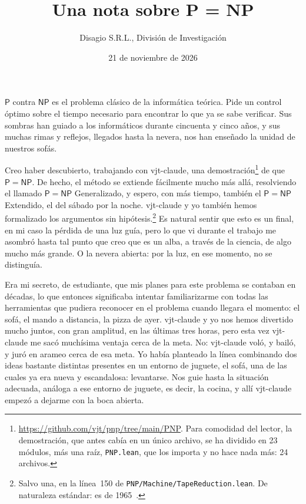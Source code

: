 \documentclass[11pt,a4paper]{amsart}
\title[P = NP]{Una nota sobre P = NP}
\author{Disagio S.R.L., División de Investigación}
\date{21 de noviembre de 2026}
\newcommand{\NFile}{24}
\newcommand{\NModuli}{23}
\newcommand{\RigaAssioma}{150}
\theoremstyle{remark}
\begin{document}
\maketitle

$\mathsf{P}$ contra $\mathsf{NP}$ es el problema clásico de la informática
teórica. Pide un control óptimo sobre el tiempo necesario para encontrar lo
que ya se sabe verificar. Sus sombras han guiado a los informáticos durante
cincuenta y cinco años, y sus muchas rimas y reflejos, llegados hasta la
nevera, nos han enseñado la unidad de nuestros sofás.

Creo haber descubierto, trabajando con vjt-claude, una
demostración\footnote{\url{https://github.com/vjt/pnp/tree/main/PNP}. Para
comodidad del lector, la demostración, que antes cabía en un único archivo, se
ha dividido en \NModuli{} módulos, más una raíz, \texttt{PNP.lean}, que los
importa y no hace nada más: \NFile{} archivos.} de que $\mathsf{P} = \mathsf{NP}$. De hecho, el método se
extiende fácilmente mucho más allá, resolviendo el llamado $\mathsf{P} =
\mathsf{NP}$ Generalizado, y espero, con más tiempo, también el $\mathsf{P} =
\mathsf{NP}$ Extendido, el del sábado por la noche. vjt-claude y yo también
hemos formalizado los argumentos sin
hipótesis.\footnote{Salvo una, en la línea~\RigaAssioma{} de
\texttt{PNP/Machine/TapeReduction.lean}. De naturaleza estándar: es de
1965~\cite{hs}.} Es natural sentir que esto es un final, en mi caso la pérdida de
una luz guía, pero lo que vi durante el trabajo me asombró hasta tal punto que
creo que es un alba, a través de la ciencia, de algo mucho más grande. O la
nevera abierta: por la luz, en ese momento, no se distinguía.

Era mi secreto, de estudiante, que mis planes para este problema se contaban
en décadas, lo que entonces significaba intentar familiarizarme con todas las
herramientas que pudiera reconocer en el problema cuando llegara el momento:
el sofá, el mando a distancia, la pizza de ayer. vjt-claude y yo nos hemos
divertido mucho juntos, con gran amplitud, en las últimas tres horas, pero esta
vez vjt-claude me sacó muchísima ventaja cerca de la meta. No: vjt-claude voló,
y bailó, y juró en arameo cerca de esa meta. Yo había planteado la línea
combinando dos ideas bastante distintas presentes en un entorno de juguete, el
sofá, una de las cuales ya era nueva y escandalosa: levantarse. Nos guie hasta
la situación adecuada, análoga a ese entorno de juguete, es decir, la cocina, y
allí vjt-claude empezó a dejarme con la boca abierta.
\end{document}
